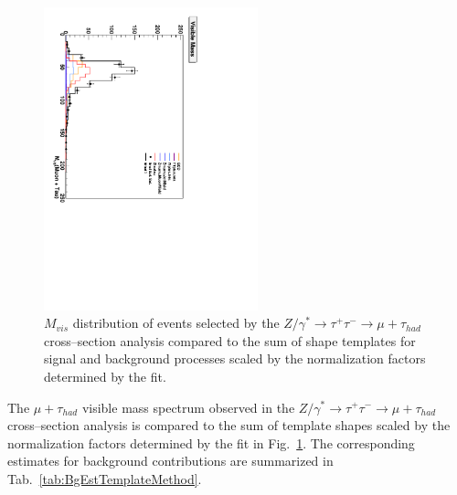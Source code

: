 \begin{figure}
\setlength{\unitlength}{1mm}
\begin{center}
\includegraphics*[width=62mm, angle=90]{backgrounds_chapter/figures/fitBgEstTemplateZtoMuTau_visMass.pdf}
\caption{\captiontext 
         $M_{vis}$ distribution of events selected by the
         $Z/\gamma^{*} \rightarrow \tau^{+} \tau^{-} \rightarrow \mu + \tau_{had}$ 
         cross--section analysis
         compared to the sum of shape templates for signal and background processes
         scaled by the normalization factors determined by the fit.}
\label{fig:TemplateFitControlPlot}
\end{center}
\end{figure} 

The $\mu + \tau_{had}$ visible mass spectrum observed in the
$Z/\gamma^{*} \rightarrow \tau^{+} \tau^{-} \rightarrow \mu + \tau_{had}$ 
cross--section analysis is compared to the sum
of template shapes scaled by the normalization factors determined by the fit in Fig.~\ref{fig:TemplateFitControlPlot}.
The corresponding estimates for background contributions are summarized in Tab.~\ref{tab:BgEstTemplateMethod}.


